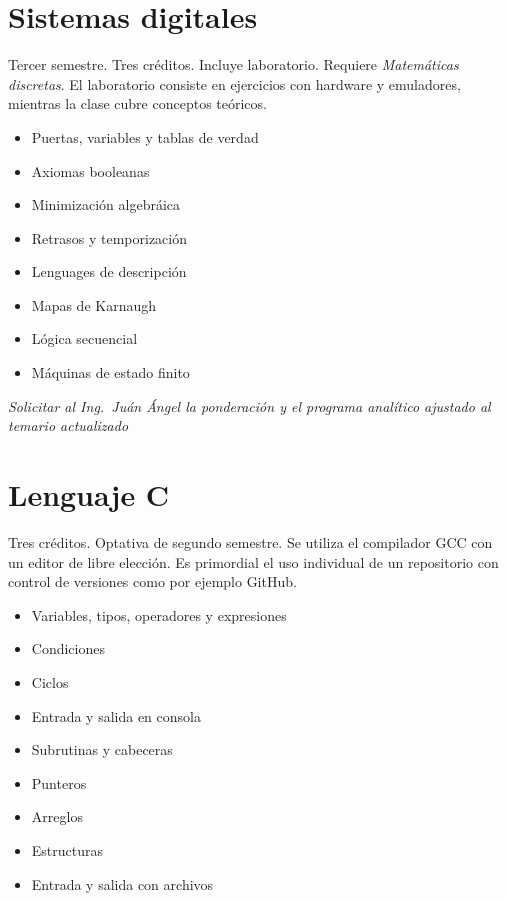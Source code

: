 \documentclass{article}
\begin{document}
\begin{multicols}{4}
\vfill\null \columnbreak

\hypertarget{sd}{\section*{Sistemas digitales}}

Tercer semestre. Tres cr\'{e}ditos. Incluye laboratorio. Requiere {\em
  Matem\'{a}ticas discretas}. El laboratorio consiste en ejercicios
con hardware y emuladores, mientras la clase cubre conceptos te\'{o}ricos.

\begin{itemize}
\item{Puertas, variables y tablas de verdad}
\item{Axiomas booleanas}
\item{Minimizaci\'{o}n algebr\'{a}ica}
\item{Retrasos y temporizaci\'{o}n}
\item{Lenguages de descripci\'{o}n}
\item{Mapas de Karnaugh}
\item{L\'{o}gica secuencial}
\item{M\'{a}quinas de estado finito}
\end{itemize}

{\em Solicitar al Ing.\ Ju\'{a}n \'{A}ngel la ponderaci\'{o}n y el programa
  anal\'{i}tico ajustado al temario actualizado}

\newpage

\hypertarget{lac}{\section*{Lenguaje C}}

Tres cr\'{e}ditos. Optativa de segundo semestre. Se utiliza el
compilador GCC con un editor de libre elecci\'{o}n. Es primordial el
uso individual de un repositorio con control de versiones como por
ejemplo GitHub.

\begin{itemize}
\item{Variables, tipos, operadores y expresiones}
\item{Condiciones}
\item{Ciclos}
\item{Entrada y salida en consola}
\item{Subrutinas y cabeceras}
\item{Punteros}
\item{Arreglos}
\item{Estructuras}
\item{Entrada y salida con archivos}  
\end{itemize}


\end{multicols}
\end{document}
